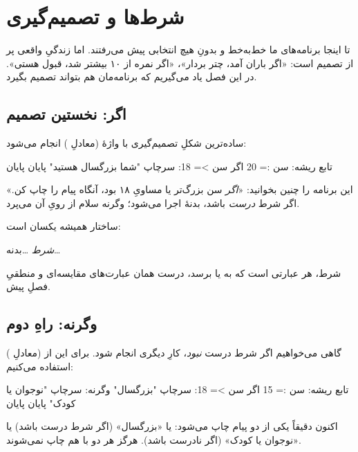 \chapter{شرط‌ها و تصمیم‌گیری}%
\label{ch:conditionals}

تا اینجا برنامه‌های ما خط‌به‌خط و بدونِ هیچ انتخابی پیش می‌رفتند. اما زندگیِ
واقعی پر از تصمیم است: «اگر باران آمد، چتر بردار»، «اگر نمره از ۱۰ بیشتر شد،
قبول هستی». در این فصل یاد می‌گیریم که برنامه‌مان هم بتواند تصمیم بگیرد.

\section{اگر: نخستین تصمیم}

ساده‌ترین شکلِ تصمیم‌گیری با واژهٔ  (معادلِ ) انجام می‌شود:

\begin{salamfa}
تابع ریشه:
    سن := 20
    اگر سن >= 18:
        سرچاپ "شما بزرگسال هستید"
    پایان
پایان
\end{salamfa}

این برنامه را چنین بخوانید: «\emph{اگر} سن بزرگ‌تر یا مساویِ ۱۸ بود، آنگاه
پیام را چاپ کن.» اگر شرط \emph{درست} باشد، بدنهٔ  اجرا می‌شود؛ وگرنه
سلام از رویِ آن می‌پرد.

ساختار همیشه یکسان است:

\begin{center}
 \;\textit{شرط}\; \code{:} \quad\ldots\;بدنه\;\ldots\quad {}
\end{center}

شرط، هر عبارتی است که به  یا  برسد، درست همان
عبارت‌های مقایسه‌ای و منطقیِ فصلِ پیش.

\section{وگرنه: راهِ دوم}

گاهی می‌خواهیم اگر شرط درست \emph{نبود}، کارِ دیگری انجام شود. برای این از
 (معادلِ ) استفاده می‌کنیم:

\begin{salamfa}
تابع ریشه:
    سن := 15
    اگر سن >= 18:
        سرچاپ "بزرگسال"
    وگرنه:
        سرچاپ "نوجوان یا کودک"
    پایان
پایان
\end{salamfa}

اکنون دقیقاً یکی از دو پیام چاپ می‌شود: یا «بزرگسال» (اگر شرط درست باشد) یا
«نوجوان یا کودک» (اگر نادرست باشد). هرگز هر دو با هم چاپ نمی‌شوند.

